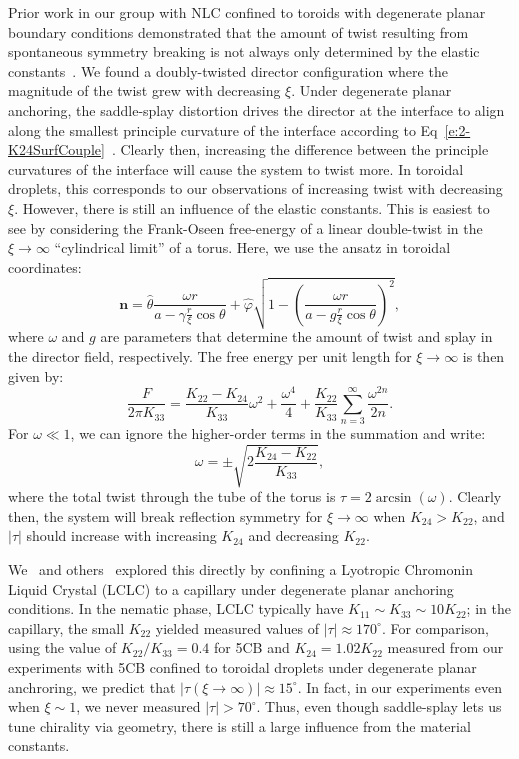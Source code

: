 Prior work in our group with NLC confined to toroids with degenerate planar boundary conditions demonstrated that the amount of twist resulting from spontaneous symmetry breaking is not always only determined by the elastic constants~\cite{RN46}.
We found a doubly-twisted director configuration where the magnitude of the twist grew with decreasing $\xi$.
Under degenerate planar anchoring, the saddle-splay distortion drives the director at the interface to align along the smallest principle curvature of the interface according to Eq~\ref{e:2-K24SurfCouple}~\cite{RN59}.
Clearly then, increasing the difference between the principle curvatures of the interface will cause the system to twist more.
In toroidal droplets, this corresponds to our observations of increasing twist with decreasing $\xi$.
However, there is still an influence of the elastic constants.
This is easiest to see by considering the Frank-Oseen free-energy of a linear double-twist in the $\xi \rightarrow \infty $ ``cylindrical limit'' of a torus.
Here, we use the ansatz in toroidal coordinates:
\begin{equation}\label{e:4-planransatz}
\mathbf{n} = \hat{\theta}\frac{\omega r}{a-\gamma \frac{r}{\xi} \cos \theta} + \hat{\varphi}\sqrt{1 - \left ( \frac{\omega r}{a-g \frac{r}{\xi} \cos \theta} \right )^2 },
\end{equation}
where $\omega$ and $g$ are parameters that determine the amount of twist and splay in the director field, respectively.
The free energy per unit length for $\xi \rightarrow \infty$ is then given by:
\begin{equation}\label{e:4-FEPlanarTwist}
  \frac{F}{2 \pi K_{33}} = \frac{K_{22}-K_{24}}{K_{33}}\omega^2 + \frac{\omega^4}{4} + \frac{K_{22}}{K_{33}}\sum\limits_{n=3}^{\infty} \frac{\omega^{2n}}{2n}.
\end{equation}
For $\omega \ll 1$, we can ignore the higher-order terms in the summation and write:
\begin{equation}
  \omega = \pm \sqrt{2\frac{K_{24}-K_{22}}{K_{33}}},
\end{equation}
where the total twist through the tube of the torus is $\tau = 2 \arcsin (\omega)$.
Clearly then, the system will break reflection symmetry for $\xi \rightarrow \infty$ when $K_{24}> K_{22}$, and $|\tau|$ should increase with increasing $K_{24}$ and decreasing $K_{22}$.

We~\cite{RN293} and others~\cite{RN191} explored this directly by confining a Lyotropic Chromonin Liquid Crystal (LCLC) to a capillary under degenerate planar anchoring conditions.
In the nematic phase, LCLC typically have $K_{11} \sim K_{33} \sim 10 K_{22}$; in the capillary, the small $K_{22}$ yielded measured values of $|\tau| \approx 170 ^{\circ}$.
For comparison, using the value of $K_{22}/K_{33}=0.4$ for 5CB and $K_{24} = 1.02 K_{22}$ measured from our experiments with 5CB confined to toroidal droplets under degenerate planar anchroring, we predict that $|\tau (\xi \rightarrow \infty)| \approx 15^{\circ}$.
In fact, in our experiments even when $\xi \sim 1$, we never measured $|\tau| > 70^{\circ}$.
Thus, even though saddle-splay lets us tune chirality via geometry, there is still a large influence from the material constants.

